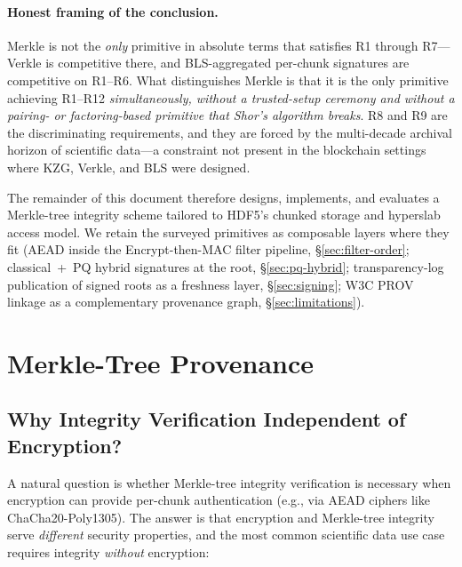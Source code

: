 \documentclass[11pt]{article}
\begin{document}
\paragraph{Honest framing of the conclusion.}
Merkle is not the \emph{only} primitive in absolute terms that satisfies R1
through R7---Verkle is competitive there, and BLS-aggregated per-chunk
signatures are competitive on R1--R6. What distinguishes Merkle is that it
is the only primitive achieving R1--R12 \emph{simultaneously, without a
trusted-setup ceremony and without a pairing- or factoring-based primitive
that Shor's algorithm breaks}. R8 and R9 are the discriminating
requirements, and they are forced by the multi-decade archival horizon of
scientific data---a constraint not present in the blockchain settings where
KZG, Verkle, and BLS were designed.

The remainder of this document therefore designs, implements, and evaluates a
Merkle-tree integrity scheme tailored to HDF5's chunked storage and hyperslab
access model. We retain the surveyed primitives as composable layers where
they fit (AEAD inside the Encrypt-then-MAC filter pipeline,
\S\ref{sec:filter-order}; classical~+~PQ hybrid signatures at the root,
\S\ref{sec:pq-hybrid}; transparency-log publication of signed roots as a
freshness layer, \S\ref{sec:signing}; W3C PROV linkage as a complementary
provenance graph, \S\ref{sec:limitations}).

\section{Merkle-Tree Provenance}
\label{sec:merkle}

\subsection{Why Integrity Verification Independent of Encryption?}
\label{sec:why-integrity}

A natural question is whether Merkle-tree integrity verification is necessary
when encryption can provide per-chunk authentication (e.g., via AEAD ciphers
like ChaCha20-Poly1305). The answer is that encryption and Merkle-tree
integrity serve \emph{different} security properties, and the most common
scientific data use case requires integrity \emph{without} encryption:
\end{document}
